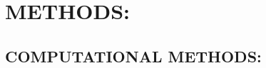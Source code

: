 \section{METHODS:} \label{sec:methods}

\subsection{COMPUTATIONAL METHODS:} \label{sec:compmethods}

\blindtext[5]
